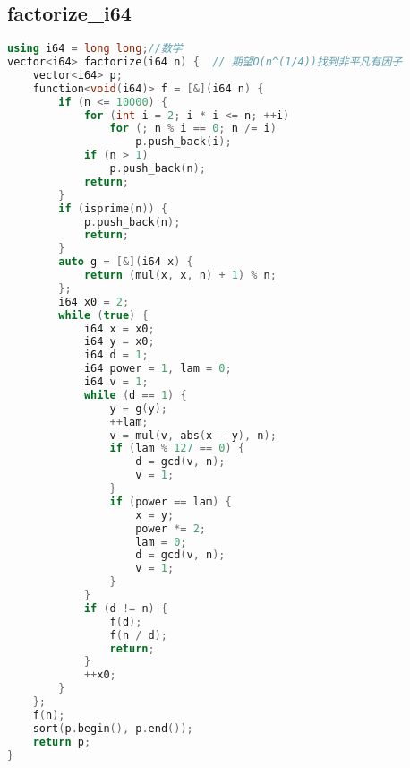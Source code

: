 \subsection{factorize\_i64}
\begin{lstlisting}[language=C++]
using i64 = long long;//数学
vector<i64> factorize(i64 n) {  // 期望O(n^(1/4))找到非平凡有因子
    vector<i64> p;
    function<void(i64)> f = [&](i64 n) {
        if (n <= 10000) {
            for (int i = 2; i * i <= n; ++i)
                for (; n % i == 0; n /= i)
                    p.push_back(i);
            if (n > 1)
                p.push_back(n);
            return;
        }
        if (isprime(n)) {
            p.push_back(n);
            return;
        }
        auto g = [&](i64 x) {
            return (mul(x, x, n) + 1) % n;
        };
        i64 x0 = 2;
        while (true) {
            i64 x = x0;
            i64 y = x0;
            i64 d = 1;
            i64 power = 1, lam = 0;
            i64 v = 1;
            while (d == 1) {
                y = g(y);
                ++lam;
                v = mul(v, abs(x - y), n);
                if (lam % 127 == 0) {
                    d = gcd(v, n);
                    v = 1;
                }
                if (power == lam) {
                    x = y;
                    power *= 2;
                    lam = 0;
                    d = gcd(v, n);
                    v = 1;
                }
            }
            if (d != n) {
                f(d);
                f(n / d);
                return;
            }
            ++x0;
        }
    };
    f(n);
    sort(p.begin(), p.end());
    return p;
}
\end{lstlisting}
